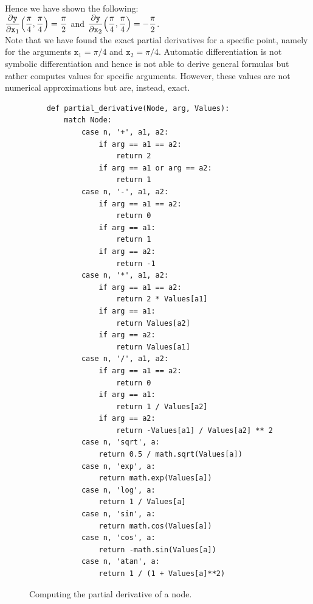Hence we have shown the following:
\\[0.2cm]
\hspace*{1.3cm}
$\displaystyle \frac{\partial \mathtt{y}}{\partial \mathtt{x}_1}\Bigl(\frac{\pi}{4}, \frac{\pi}{4}\Bigr) = \frac{\pi}{2}$ \quad and \quad
$\displaystyle \frac{\partial \mathtt{y}}{\partial \mathtt{x}_2}\Bigl(\frac{\pi}{4}, \frac{\pi}{4}\Bigr) = - \frac{\pi}{2}$.
\\[0.2cm]     
Note that we have found the exact partial derivatives for a specific point, namely for the arguments
$\mathtt{x}_1 = \pi/4$ and $\mathtt{x}_2 = \pi/4$.  Automatic differentiation is not symbolic differentiation
and hence is not able to derive general formulas but rather computes values for specific arguments.  However,
these values are not numerical approximations but are, instead, exact.
\eoxs

\begin{figure}[!ht]
\centering
\begin{verbatim}
    def partial_derivative(Node, arg, Values):
        match Node:
            case n, '+', a1, a2:
                if arg == a1 == a2:
                    return 2
                if arg == a1 or arg == a2:
                    return 1
            case n, '-', a1, a2:
                if arg == a1 == a2:
                    return 0
                if arg == a1:
                    return 1
                if arg == a2:
                    return -1
            case n, '*', a1, a2:
                if arg == a1 == a2:
                    return 2 * Values[a1]
                if arg == a1:
                    return Values[a2]
                if arg == a2:
                    return Values[a1]
            case n, '/', a1, a2:
                if arg == a1 == a2:
                    return 0
                if arg == a1:
                    return 1 / Values[a2]
                if arg == a2:
                    return -Values[a1] / Values[a2] ** 2
            case n, 'sqrt', a:
                return 0.5 / math.sqrt(Values[a])
            case n, 'exp', a:
                return math.exp(Values[a])
            case n, 'log', a:
                return 1 / Values[a]
            case n, 'sin', a:
                return math.cos(Values[a])
            case n, 'cos', a:
                return -math.sin(Values[a])
            case n, 'atan', a:
                return 1 / (1 + Values[a]**2)
\end{verbatim}
\vspace*{-0.3cm}
\caption{Computing the partial derivative of a node.}
\label{fig:Reverse-Mode-AD.ipynb:partial_derivative}
\end{figure}


